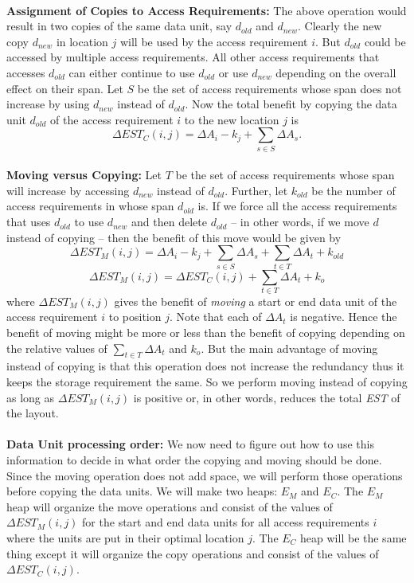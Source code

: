 \\
{\bf Assignment of Copies to Access Requirements:} The above operation would result in two copies of the same data unit, say $d_{old}$ and $d_{new}$. Clearly the new copy $d_{new}$ in location $j$ will be used by the access requirement $i$.  But $d_{old}$ could be accessed by
multiple access requirements. All other access requirements that accesses $d_{old}$ can either continue to use $d_{old}$ or use $d_{new}$ depending on the overall effect on their span. Let $S$ be the set of access requirements whose span does not increase by using $d_{new}$ instead of $d_{old}$. Now the total benefit by copying the data unit $d_{old}$ of the access requirement $i$ to the new location $j$ is
\begin{equation}
\Delta EST_C(i,j) = \Delta A_i - k_j + \sum_{s\in S}\Delta{A_s}.
\label{eq:copyingcost}
\end{equation}
\\
{\bf Moving versus Copying:} Let $T$ be the set of access requirements whose span will increase by accessing $d_{new}$ instead of $d_{old}$. Further, let $k_{old}$ be the number of access requirements in whose span $d_{old}$ is. If we force all the access requirements that uses $d_{old}$ to use $d_{new}$ and then delete $d_{old}$ -- in other words, if we move $d$ instead of copying -- then the benefit of this move would be given by
\[
 \Delta EST_M(i,j) = \Delta A_i - k_j + \sum_{s\in S}\Delta{A_s} + \sum_{t\in T}\Delta{A_t} + k_{old}
\]
\[
 \Delta EST_M(i,j) = \Delta EST_C(i,j) + \sum_{t\in T}\Delta{A_t} + k_o
\]
where $\Delta EST_M(i,j)$ gives the benefit of {\it moving} a start or end data unit of the access requirement $i$ to position $j$. Note that each of $\Delta A_t$ is negative. Hence the benefit of moving might be more or less than the benefit of copying depending on the relative values of $\sum_{t\in T}\Delta{A_t}$ and $k_o$. But the main advantage of moving instead of copying is that this operation does not increase the redundancy thus it keeps the storage requirement the same. So we perform moving instead of copying as long as $\Delta EST_M(i,j)$ is positive or, in other words, reduces the total {\em EST} of the layout.\\
\\
{\bf Data Unit processing order:} We now need to figure out how to use this
information to decide in what order the copying and moving should be done. Since the moving operation does not add space, we will perform those operations before copying the data units. We will make two heaps: $E_M$ and $E_C$. The $E_M$ heap will organize the move operations and consist of the values of $\Delta EST_M(i,j)$ for the start and end data units for all access requirements $i$ where the units are put in their optimal location $j$. The $E_C$ heap will be the same thing except it will organize the copy operations and consist of the values of $\Delta EST_C(i,j)$.\\

